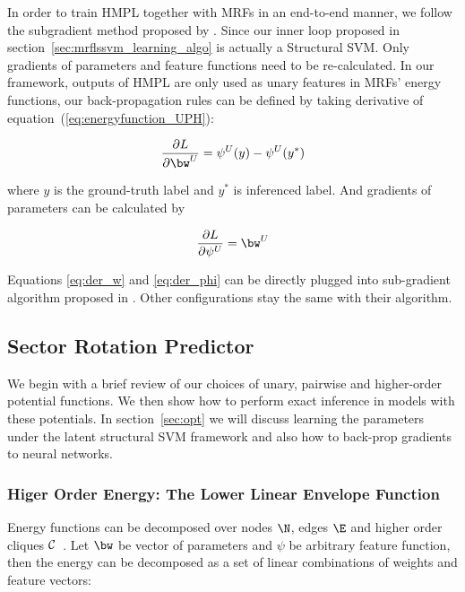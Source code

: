 \documentclass[sigconf]{acmart}
\renewcommand{\citename}{\citet}
\renewcommand{\cite}{\citep}
\begin{document}
In order to train HMPL together with MRFs in an end-to-end manner,
we follow the subgradient method proposed by \citename{witoonchart2017application}.
Since our inner loop proposed in section~\ref{sec:mrflssvm_learning_algo}
is actually a Structural SVM. Only gradients of parameters and feature
functions need to be re-calculated. 
In our framework, outputs of HMPL are only used as unary features in MRFs'
energy functions, our back-propagation rules can be defined by
taking derivative of equation~(\ref{eq:energyfunction_UPH}):

\begin{align}
  \label{eq:der_w}
  \frac{\partial L}{\partial \bw^U} = \psi^U(y)-\psi^U(y^*)
\end{align}

\noindent where $y$ is the ground-truth label and $y^*$ is
inferenced label. And gradients of parameters can be calculated by

\begin{align}
  \label{eq:der_phi}
  \frac{\partial L}{\partial \psi^U} = \bw^U
\end{align}

Equations \eqref{eq:der_w} and \eqref{eq:der_phi} can be directly plugged
into sub-gradient algorithm proposed in \cite{witoonchart2017application}.
Other configurations stay the same with their algorithm.

\subsection{Sector Rotation Predictor}
\label{sec:srp}

We begin with a brief review of our choices of unary, pairwise
and higher-order potential functions. We then show how to perform
exact inference in models with these potentials. In
section~\ref{sec:opt} we will discuss learning the
parameters under the latent structural SVM framework and also how
to back-prop gradients to neural networks.


\subsubsection{Higer Order Energy: The Lower Linear Envelope Function}
\label{sec:llep}

Energy functions can be decomposed over nodes $\N$, edges $\E$
and higher order cliques $\cal C$~\cite{Szummer:ECCV08}. Let
$\bw$ be vector of parameters and $\psi$ be arbitrary feature
function, then the energy can be decomposed as a set of linear
combinations of weights and feature vectors:
\end{document}
